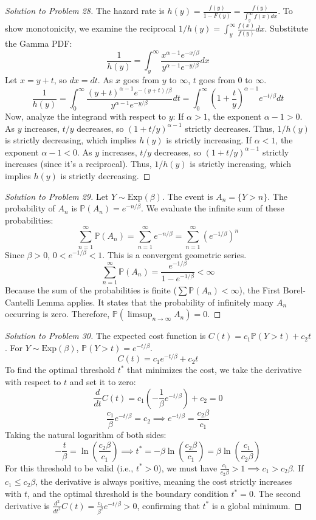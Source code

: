 \documentclass[11pt, a4paper]{article}
\theoremstyle{definition}
\theoremstyle{remark}
\newcommand{\Prob}{\mathbb{P}}
\begin{document}
\begin{proof}[Solution to Problem 28]
The hazard rate is $h(y) = \frac{f(y)}{1 - F(y)} = \frac{f(y)}{\int_y^\infty f(x) dx}$.
To show monotonicity, we examine the reciprocal $1/h(y) = \int_y^\infty \frac{f(x)}{f(y)} dx$.
Substitute the Gamma PDF:
\[ \frac{1}{h(y)} = \int_y^\infty \frac{x^{\alpha-1} e^{-x/\beta}}{y^{\alpha-1} e^{-y/\beta}} dx \]
Let $x = y + t$, so $dx = dt$. As $x$ goes from $y$ to $\infty$, $t$ goes from $0$ to $\infty$.
\[ \frac{1}{h(y)} = \int_0^\infty \frac{(y+t)^{\alpha-1} e^{-(y+t)/\beta}}{y^{\alpha-1} e^{-y/\beta}} dt = \int_0^\infty \left( 1 + \frac{t}{y} \right)^{\alpha-1} e^{-t/\beta} dt \]
Now, analyze the integrand with respect to $y$:
If $\alpha > 1$, the exponent $\alpha - 1 > 0$. As $y$ increases, $t/y$ decreases, so $(1 + t/y)^{\alpha-1}$ strictly decreases. Thus, $1/h(y)$ is strictly decreasing, which implies $h(y)$ is strictly increasing.
If $\alpha < 1$, the exponent $\alpha - 1 < 0$. As $y$ increases, $t/y$ decreases, so $(1 + t/y)^{\alpha-1}$ strictly increases (since it's a reciprocal). Thus, $1/h(y)$ is strictly increasing, which implies $h(y)$ is strictly decreasing.
\end{proof}

\begin{proof}[Solution to Problem 29]
Let $Y \sim \text{Exp}(\beta)$. The event is $A_n = \{Y > n\}$.
The probability of $A_n$ is $\Prob(A_n) = e^{-n/\beta}$.
We evaluate the infinite sum of these probabilities:
\[ \sum_{n=1}^\infty \Prob(A_n) = \sum_{n=1}^\infty e^{-n/\beta} = \sum_{n=1}^\infty (e^{-1/\beta})^n \]
Since $\beta > 0$, $0 < e^{-1/\beta} < 1$. This is a convergent geometric series.
\[ \sum_{n=1}^\infty \Prob(A_n) = \frac{e^{-1/\beta}}{1 - e^{-1/\beta}} < \infty \]
Because the sum of the probabilities is finite ($\sum \Prob(A_n) < \infty$), the First Borel-Cantelli Lemma applies. It states that the probability of infinitely many $A_n$ occurring is zero.
Therefore, $\Prob(\limsup_{n \to \infty} A_n) = 0$.
\end{proof}

\begin{proof}[Solution to Problem 30]
The expected cost function is $C(t) = c_1 \Prob(Y > t) + c_2 t$.
For $Y \sim \text{Exp}(\beta)$, $\Prob(Y > t) = e^{-t/\beta}$.
\[ C(t) = c_1 e^{-t/\beta} + c_2 t \]
To find the optimal threshold $t^*$ that minimizes the cost, we take the derivative with respect to $t$ and set it to zero:
\[ \frac{d}{dt} C(t) = c_1 \left( -\frac{1}{\beta} e^{-t/\beta} \right) + c_2 = 0 \]
\[ \frac{c_1}{\beta} e^{-t/\beta} = c_2 \implies e^{-t/\beta} = \frac{c_2 \beta}{c_1} \]
Taking the natural logarithm of both sides:
\[ -\frac{t}{\beta} = \ln\left( \frac{c_2 \beta}{c_1} \right) \implies t^* = -\beta \ln\left( \frac{c_2 \beta}{c_1} \right) = \beta \ln\left( \frac{c_1}{c_2 \beta} \right) \]
For this threshold to be valid (i.e., $t^* > 0$), we must have $\frac{c_1}{c_2 \beta} > 1 \implies c_1 > c_2 \beta$. If $c_1 \le c_2 \beta$, the derivative is always positive, meaning the cost strictly increases with $t$, and the optimal threshold is the boundary condition $t^* = 0$.
The second derivative is $\frac{d^2}{dt^2} C(t) = \frac{c_1}{\beta^2} e^{-t/\beta} > 0$, confirming that $t^*$ is a global minimum.
\end{proof}
\end{document}
